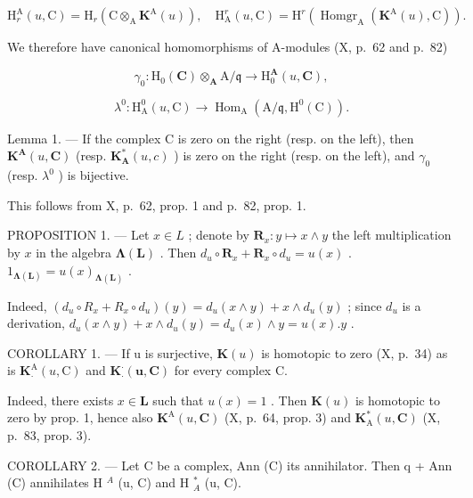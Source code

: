 \[
\mathrm{H} _ {r} ^ {\mathrm{A}} (u, \mathrm{C}) = \mathrm{H} _ {r} (\mathrm{C} \otimes_ {\mathrm{A}} \mathbf {K} ^ {\mathrm{A}} (u)), \quad \mathrm{H} _ {\mathrm{A}} ^ {r} (u, \mathrm{C}) = \mathrm{H} ^ {r} (\operatorname{Homgr} _ {\mathrm{A}} (\mathbf {K} ^ {\mathrm{A}} (u), \mathrm{C})) .
\]

We therefore have canonical homomorphisms of A-modules (X, p.~62 and p.~82)

\[
\gamma_ {0}: \mathrm{H} _ {0} (\mathbf {C}) \otimes_ {\mathbf {A}} \mathrm{A} / \mathfrak {q} \rightarrow \mathrm{H} _ {0} ^ {\mathbf {A}} (u, \mathbf {C}),
\]

\[
\lambda^ {0}: \mathrm{H} _ {\mathrm{A}} ^ {0} (u, \mathrm{C}) \rightarrow \operatorname{Hom} _ {\mathrm{A}} (\mathrm{A} / \mathfrak {q}, \mathrm{H} ^ {0} (\mathrm{C})).
\]

Lemma 1. --- If the complex C is zero on the right (resp. on the left), then \(\mathbf{K}^{\mathbf{A}}(u,\mathbf{C})\) (resp. \(\mathbf{K}_{\mathbf{A}}^{*}(u,c)\) ) is zero on the right (resp. on the left), and \(\gamma_{0}\) (resp. \(\lambda^{0}\) ) is bijective.

This follows from X, p.~62, prop. 1 and p.~82, prop. 1.

PROPOSITION 1. --- Let \(x \in L\) ; denote by \(\mathbf{R}_{x}: y \mapsto x \wedge y\) the left multiplication by \(x\) in the algebra \(\boldsymbol{\Lambda}(\mathbf{L})\) . Then \(d_{u} \circ \mathbf{R}_{x} + \mathbf{R}_{x} \circ d_{u} = u(x)\) . \(1_{\boldsymbol{\Lambda}(\mathbf{L})} = u(x)_{\boldsymbol{\Lambda}(\mathbf{L})}\) .

Indeed, \((d_u \circ R_x + R_x \circ d_u)(y) = d_u(x \wedge y) + x \wedge d_u(y)\) ; since \(d_u\) is a derivation, \(d_u(x \wedge y) + x \wedge d_u(y) = d_u(x) \wedge y = u(x).y\) .

COROLLARY 1. --- If u is surjective, \(\mathbf{K}(u)\) is homotopic to zero (X, p.~34) as is \(\mathbf{K}_{\cdot}^{\mathrm{A}}(u,\mathrm{C})\) and \(\mathbf{K}_{\cdot}^{\cdot}(\mathbf{u},\mathbf{C})\) for every complex C.

Indeed, there exists \(x \in \mathbf{L}\) such that \(u(x) = 1\) . Then \(\mathbf{K}(u)\) is homotopic to zero by prop. 1, hence also \(\mathbf{K}^{\mathrm{A}}(u, \mathbf{C})\) (X, p.~64, prop. 3) and \(\mathbf{K}_{\mathrm{A}}^{*}(u, \mathbf{C})\) (X, p.~83, prop. 3).

COROLLARY 2. --- Let C be a complex, Ann (C) its annihilator. Then q + Ann (C) annihilates H \(^{A}\) (u, C) and H \(^{*}_{A}\) (u, C).


